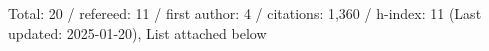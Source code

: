 Total: 20 / refereed: 11 / first author: 4 / citations: 1,360 / h-index: 11 (Last updated: 2025-01-20), List attached below